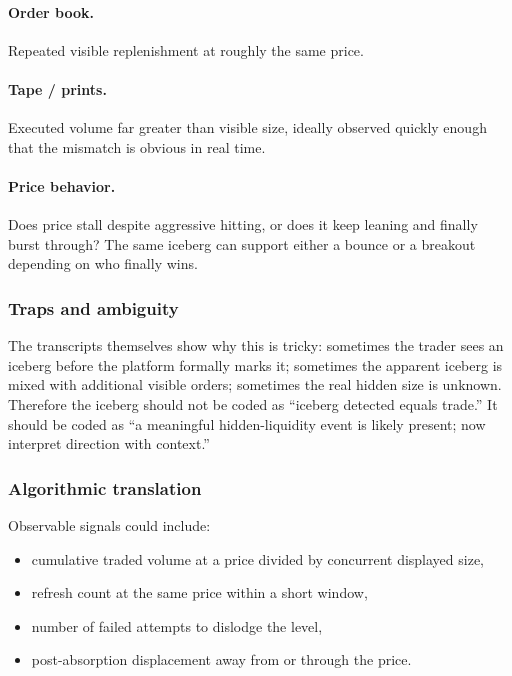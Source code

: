\paragraph{Order book.}
Repeated visible replenishment at roughly the same price.

\paragraph{Tape / prints.}
Executed volume far greater than visible size, ideally observed quickly enough that the mismatch
is obvious in real time.

\paragraph{Price behavior.}
Does price stall despite aggressive hitting, or does it keep leaning and finally burst through?
The same iceberg can support either a bounce or a breakout depending on who finally wins.

\subsubsection{Traps and ambiguity}

The transcripts themselves show why this is tricky: sometimes the trader sees an iceberg before
the platform formally marks it; sometimes the apparent iceberg is mixed with additional visible
orders; sometimes the real hidden size is unknown. Therefore the iceberg should not be coded as
``iceberg detected equals trade.'' It should be coded as ``a meaningful hidden-liquidity event
is likely present; now interpret direction with context.''

\subsubsection{Algorithmic translation}

Observable signals could include:

\begin{itemize}[leftmargin=1.4em]
  \item cumulative traded volume at a price divided by concurrent displayed size,
  \item refresh count at the same price within a short window,
  \item number of failed attempts to dislodge the level,
  \item post-absorption displacement away from or through the price.
\end{itemize}

